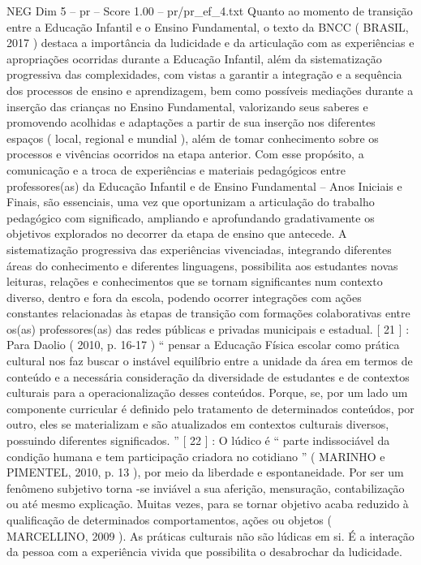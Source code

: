 \begin{textsample}{NEG Dim 5 – pr – Score 1.00 – pr/pr\_ef\_4.txt}
Quanto ao momento de transição entre a Educação Infantil e o Ensino Fundamental, o texto da BNCC ( BRASIL, 2017 ) destaca a importância da ludicidade e da articulação com as experiências e apropriações ocorridas durante a Educação Infantil, além da sistematização progressiva das complexidades, com vistas a garantir a integração e a sequência dos processos de ensino e aprendizagem, bem como possíveis mediações durante a inserção das crianças no Ensino Fundamental, valorizando seus saberes e promovendo acolhidas e adaptações a partir de sua inserção nos diferentes espaços ( local, regional e mundial ), além de tomar conhecimento sobre os processos e vivências ocorridos na etapa anterior.
Com esse propósito, a comunicação e a troca de experiências e materiais pedagógicos entre professores(as) da Educação Infantil e de Ensino Fundamental – Anos Iniciais e Finais, são essenciais, uma vez que oportunizam a articulação do trabalho pedagógico com significado, ampliando e aprofundando gradativamente os objetivos explorados no decorrer da etapa de ensino que antecede.
A sistematização progressiva das experiências vivenciadas, integrando diferentes áreas do conhecimento e diferentes linguagens, possibilita aos estudantes novas leituras, relações e conhecimentos que se tornam significantes num contexto diverso, dentro e fora da escola, podendo ocorrer integrações com ações constantes relacionadas às etapas de transição com formações colaborativas entre os(as) professores(as) das redes públicas e privadas municipais e estadual. [ 21 ] : Para Daolio ( 2010, p. 16-17 ) “ pensar a Educação Física escolar como prática cultural nos faz buscar o instável equilíbrio entre a unidade da área em termos de conteúdo e a necessária consideração da diversidade de estudantes e de contextos culturais para a operacionalização desses conteúdos.
Porque, se, por um lado um componente curricular é definido pelo tratamento de determinados conteúdos, por outro, eles se materializam e são atualizados em contextos culturais diversos, possuindo diferentes significados. ” [ 22 ] : O lúdico é “ parte indissociável da condição humana e tem participação criadora no cotidiano ” ( MARINHO e PIMENTEL, 2010, p. 13 ), por meio da liberdade e espontaneidade.
Por ser um fenômeno subjetivo torna -se inviável a sua aferição, mensuração, contabilização ou até mesmo explicação.
Muitas vezes, para se tornar objetivo acaba reduzido à qualificação de determinados comportamentos, ações ou objetos ( MARCELLINO, 2009 ).
As práticas culturais não são lúdicas em si.
É a interação da pessoa com a experiência vivida que possibilita o desabrochar da ludicidade.

\end{textsample}
